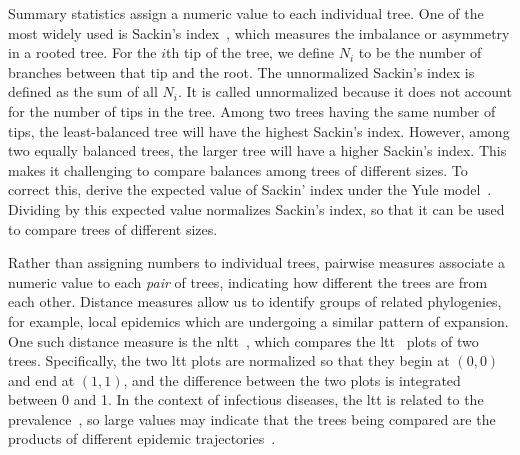 Summary statistics assign a numeric value to each individual tree. One of the
most widely used is Sackin's index~\autocite{shao1990tree}, which measures the
imbalance or asymmetry in a rooted tree. For the $i$th tip of the tree, we
define $N_i$ to be the number of branches between that tip and the root. The
unnormalized Sackin's index is defined as the sum of all $N_i$. It is called
unnormalized because it does not account for the number of tips in the tree.
Among two trees having the same number of tips, the least-balanced tree will
have the highest Sackin's index. However, among two equally balanced trees, the
larger tree will have a higher Sackin's index. This makes it challenging to
compare balances among trees of different sizes. To correct this,
\textcite{kirkpatrick1993searching} derive the expected value of Sackin' index
under the Yule model~\autocite{yule1925mathematical}. Dividing by this expected
value normalizes Sackin's index, so that it can be used to compare trees of
different sizes.

Rather than assigning numbers to individual trees, pairwise measures associate
a numeric value to each \textit{pair} of trees, indicating how different the
trees are from each other. Distance measures allow us to identify groups of
related phylogenies, for example, local epidemics which are undergoing a
similar pattern of expansion. One such distance measure is the
\gls{nltt}~\autocite{janzen2015approximate}, which compares the
\gls{ltt}~\autocite{nee1992tempo} plots of two trees. Specifically, the two
\gls{ltt} plots are normalized so that they begin at $(0, 0)$ and end at $(1,
1)$, and the difference between the two plots is integrated between 0 and 1. In
the context of infectious diseases, the \gls{ltt} is related to the
prevalence~\autocite{holmes1995revealing}, so large values may indicate that
the trees being compared are the products of different epidemic
trajectories~\autocite{janzen2015approximate}.


